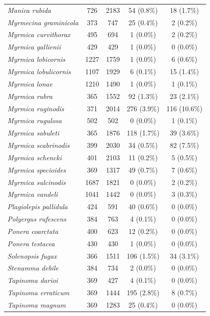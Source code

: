 \documentclass[preprint,final,times,12pt,3p]{elsarticle}
\begin{document}
\begin{longtable}{ l c c c c}
	\emph{Manica rubida} & 726 & 2183 & 54 (0.8\%) & 18 (1.7\%) \\
	\emph{Myrmecina graminicola} & 373 & 747 & 25 (0.4\%) & 2 (0.2\%) \\
	\emph{Myrmica curvithorax} & 495 & 694 & 1 (0.0\%) & 2 (0.2\%) \\
	\emph{Myrmica gallienii} & 429 & 429 & 1 (0.0\%) & 0 (0.0\%) \\
	\emph{Myrmica lobicornis} & 1227 & 1759 & 1 (0.0\%) & 6 (0.6\%) \\
	\emph{Myrmica lobulicornis} & 1107 & 1929 & 6 (0.1\%) & 15 (1.4\%) \\
	\emph{Myrmica lonae} & 1210 & 1490 & 1 (0.0\%) & 1 (0.1\%) \\
	\emph{Myrmica rubra} & 365 & 1552 & 92 (1.3\%) & 23 (2.1\%) \\
	\emph{Myrmica ruginodis} & 371 & 2014 & 276 (3.9\%) & 116 (10.6\%) \\
	\emph{Myrmica rugulosa} & 502 & 502 & 0 (0.0\%) & 1 (0.1\%) \\
	\emph{Myrmica sabuleti} & 365 & 1876 & 118 (1.7\%) & 39 (3.6\%) \\
	\emph{Myrmica scabrinodis} & 399 & 2030 & 34 (0.5\%) & 82 (7.5\%) \\
	\emph{Myrmica schencki} & 401 & 2103 & 11 (0.2\%) & 5 (0.5\%) \\
	\emph{Myrmica specioides} & 369 & 1317 & 49 (0.7\%) & 7 (0.6\%) \\
	\emph{Myrmica sulcinodis} & 1687 & 1821 & 0 (0.0\%) & 2 (0.2\%) \\
	\emph{Myrmica vandeli} & 1041 & 1442 & 0 (0.0\%) & 3 (0.3\%) \\
	\emph{Plagiolepis pallidula} & 424 & 591 & 40 (0.6\%) & 0 (0.0\%) \\
	\emph{Polyergus rufescens} & 384 & 763 & 4 (0.1\%) & 0 (0.0\%) \\
	\emph{Ponera coarctata} & 400 & 623 & 12 (0.2\%) & 0 (0.0\%) \\
	\emph{Ponera testacea} & 430 & 430 & 1 (0.0\%) & 0 (0.0\%) \\
	\emph{Solenopsis fugax} & 366 & 1511 & 106 (1.5\%) & 34 (3.1\%) \\
	\emph{Stenamma debile} & 384 & 734 & 2 (0.0\%) & 0 (0.0\%) \\
	\emph{Tapinoma darioi} & 369 & 427 & 4 (0.1\%) & 0 (0.0\%) \\
	\emph{Tapinoma erraticum} & 369 & 1444 & 195 (2.8\%) & 8 (0.7\%) \\
	\emph{Tapinoma magnum} & 369 & 1283 & 25 (0.4\%) & 0 (0.0\%) \\

\end{longtable}
\end{document}
